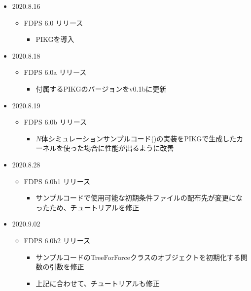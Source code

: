 \begin{itemize}
  \item 2020.8.16
    \begin{itemize}
    \item FDPS 6.0 リリース
       \begin{itemize}
          \item PIKGを導入
       \end{itemize}
    \end{itemize}
    
  \item 2020.8.18
    \begin{itemize}
    \item FDPS 6.0a リリース
       \begin{itemize}
          \item 付属するPIKGのバージョンをv0.1bに更新
       \end{itemize}
    \end{itemize}

  \item 2020.8.19
    \begin{itemize}
    \item FDPS 6.0b リリース
       \begin{itemize}
          \item $N$体シミュレーションサンプルコード()の実装をPIKGで生成したカーネルを使った場合に性能が出るように改善
       \end{itemize}
    \end{itemize}

  \item 2020.8.28
    \begin{itemize}
    \item FDPS 6.0b1 リリース
       \begin{itemize}
          \item サンプルコードで使用可能な初期条件ファイルの配布先が変更になったため、チュートリアルを修正
       \end{itemize}
    \end{itemize}


  \item 2020.9.02
    \begin{itemize}
    \item FDPS 6.0b2 リリース
       \begin{itemize}
          \item サンプルコードのTreeForForceクラスのオブジェクトを初期化する関数の引数を修正
          \item 上記に合わせて、チュートリアルも修正
       \end{itemize}
    \end{itemize}

\end{itemize}
